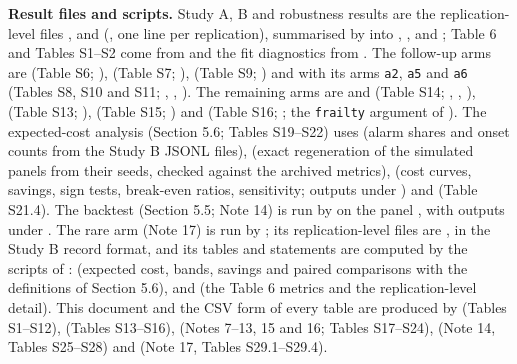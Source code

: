\documentclass[10pt,a4paper]{article}
\begin{document}
\clearpage


\clearpage
\textbf{Result files and scripts.} Study A, B and robustness results are the replication-level files ,  and  (, one line per replication), summarised by  into , ,  and ; Table 6 and Tables S1--S2 come from  and the fit diagnostics from . The follow-up arms are  (Table S6; ),  (Table S7; ),  (Table S9; ) and  with its arms \texttt{a2}, \texttt{a5} and \texttt{a6} (Tables S8, S10 and S11; , , ). The remaining arms are  and  (Table S14; , , ),  (Table S13; ),  (Table S15; ) and  (Table S16; ; the \texttt{frailty} argument of ). The expected-cost analysis (Section 5.6; Tables S19--S22) uses  (alarm shares and onset counts from the Study B JSONL files),  (exact regeneration of the simulated panels from their seeds, checked against the archived metrics),  (cost curves, savings, sign tests, break-even ratios, sensitivity; outputs under ) and  (Table S21.4). The backtest (Section 5.5; Note 14) is run by  on the panel , with outputs under . The rare arm (Note 17) is run by ; its replication-level files are , in the Study B record format, and its tables and statements are computed by the scripts of :  (expected cost, bands, savings and paired comparisons with the definitions of Section 5.6),  and  (the Table 6 metrics and the replication-level detail). This document and the CSV form of every table are produced by  (Tables S1--S12),  (Tables S13--S16),  (Notes 7--13, 15 and 16; Tables S17--S24),  (Note 14, Tables S25--S28) and  (Note 17, Tables S29.1--S29.4).
\end{document}
